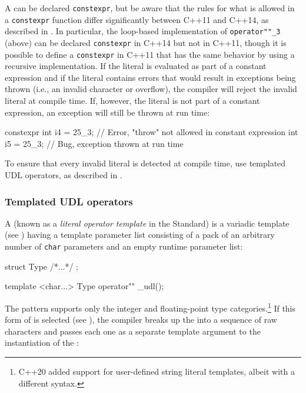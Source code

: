 A  can be declared \lstinline!constexpr!, but be
aware that the rules for what is allowed in a \lstinline!constexpr!
function differ significantly between C++11 and C++14, as described in . In particular, the
loop-based implementation of \lstinline!operator""_3! (above) can be
declared \lstinline!constexpr! in C++14 but not in C++11, though it is
possible to define a \lstinline!constexpr!  in C++11
that has the same behavior by using a recursive implementation. If the
literal is evaluated as part of a constant expression and if the literal
contains errors that would result in exceptions being thrown (i.e., an
invalid character or overflow), the compiler will reject the invalid
literal at compile time. If, however, the literal is not part of a
constant expression, an exception will still be thrown at run time:

\begin{emcppslisting}[emcppsbatch=e11]
constexpr int i4 = 25_3;  // Error, "throw" not allowed in constant expression
          int i5 = 25_3;  // Bug, exception thrown at run time
\end{emcppslisting}
    
\noindent To ensure that every invalid literal is detected at compile time, use
templated UDL operators, as described in .

\subsubsection[Templated UDL operators]{Templated UDL operators}\label{templated-udl-operators}

A  (known as a \emph{literal operator
template} in the Standard) is a variadic template (see ) having a template parameter list
consisting of a pack of an arbitrary number of \lstinline!char! parameters
and an empty runtime parameter list:

\begin{emcppslisting}[emcppsbatch=e12]
struct Type { /*...*/ };

template <char...> Type operator"" _udl();
\end{emcppslisting}
    
\noindent The  pattern supports only the integer
and floating-point type categories.{\cprotect\footnote{C++20 added
support for user-defined string literal templates, albeit with a
  different syntax.}} If this form of  is selected
(see ), the compiler breaks up the
 into a sequence of raw characters and passes each
one as a separate template argument to the instantiation of the
:


